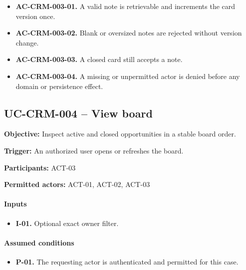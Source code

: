 \documentclass[10pt,a4paper]{article}
\begin{document}
\begin{itemize}

\item \textbf{AC-CRM-003-01.} A valid note is retrievable and increments the card version once.

\item \textbf{AC-CRM-003-02.} Blank or oversized notes are rejected without version change.

\item \textbf{AC-CRM-003-03.} A closed card still accepts a note.

\item \textbf{AC-CRM-003-04.} A missing or unpermitted actor is denied before any domain or persistence effect.

\end{itemize}

\subsection{UC-CRM-004 -- View board}

\textbf{Objective:} Inspect active and closed opportunities in a stable board order.

\textbf{Trigger:} An authorized user opens or refreshes the board.

\textbf{Participants:} ACT-03

\textbf{Permitted actors:} ACT-01, ACT-02, ACT-03

\paragraph{Inputs}

\begin{itemize}

\item \textbf{I-01.} Optional exact owner filter.

\end{itemize}

\paragraph{Assumed conditions}

\begin{itemize}

\item \textbf{P-01.} The requesting actor is authenticated and permitted for this case.

\end{itemize}
\end{document}
